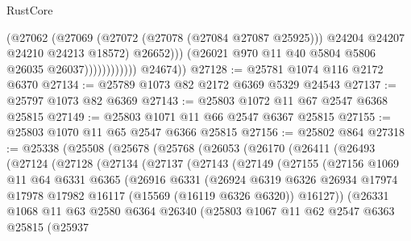 \begin{lexlean}{RustCore}
\begin{coremodule}
                                  (@27062
                                    (@27069
                                      (@27072 (@27078 (@27084 @27087 @25925)))
                                      @24204
                                      @24207
                                      @24210
                                      @24213
                                      @18572)
                                    @26652)))
                              (@26021 @970 @11 @40 @5804 @5806 @26035 @26037))))))))))))
        @24674))
@27128 := @25781 @1074 @116 @2172 @6370
@27134 := @25789 @1073 @82 @2172 @6369 @5329 @24543
@27137 := @25797 @1073 @82 @6369
@27143 := @25803 @1072 @11 @67 @2547 @6368 @25815
@27149 := @25803 @1071 @11 @66 @2547 @6367 @25815
@27155 := @25803 @1070 @11 @65 @2547 @6366 @25815
@27156 := @25802 @864
@27318 := @25338
    (@25508
      (@25678
        (@25768
          (@26053
            (@26170
              (@26411
                (@26493
                  (@27124
                    (@27128
                      (@27134
                        (@27137
                          (@27143
                            (@27149
                              (@27155
                                (@27156
                                  @1069
                                  @11
                                  @64
                                  @6331
                                  @6365
                                  (@26916
                                    @6331
                                    (@26924
                                      @6319
                                      @6326
                                      @26934
                                      @17974
                                      @17978
                                      @17982
                                      @16117
                                      (@15569 (@16119 @6326 @6320))
                                      @16127))
                                  (@26331
                                    @1068
                                    @11
                                    @63
                                    @2580
                                    @6364
                                    @26340
                                    (@25803
                                      @1067
                                      @11
                                      @62
                                      @2547
                                      @6363
                                      @25815
                                      (@25937

\end{coremodule}
\end{lexlean}
